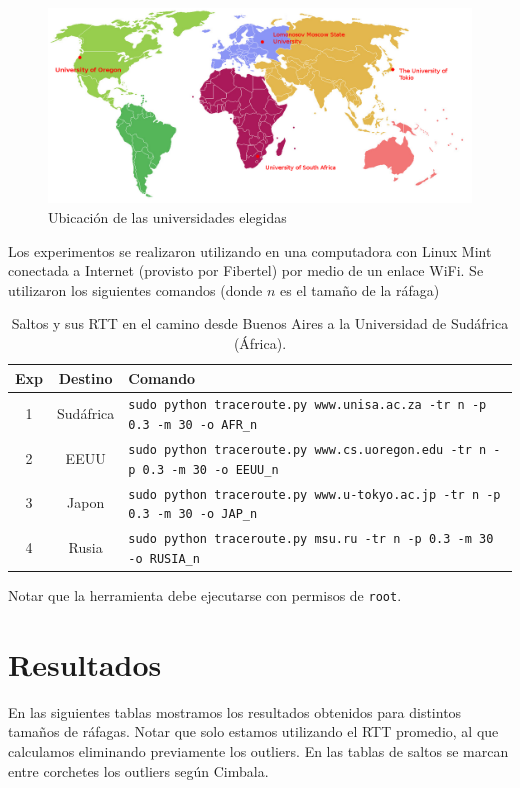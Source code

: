  
\begin{figure}[H]
  \centering
  \includegraphics[scale = 0.3]{imagenes/mapa.png}
  \caption{Ubicación de las universidades elegidas}
  \label{histogramaprobabilidadesModel1}
\end{figure}


Los experimentos se realizaron utilizando en una computadora con Linux Mint conectada a Internet (provisto por Fibertel) por medio de un enlace WiFi. Se utilizaron los siguientes comandos (donde $n$ es el tamaño de la ráfaga) 
\begin{table}[]
\centering
\caption{Saltos y sus RTT en el camino desde Buenos Aires a la Universidad de Sudáfrica (África).}
\begin{tabular}{ | c | c | l |}
	\hline 
Exp & Destino & Comando\\ \hline
 1 & Sudáfrica & \texttt{sudo python traceroute.py www.unisa.ac.za -tr n -p 0.3 -m 30 -o AFR\_n} \\ 
  2 & EEUU& \texttt{sudo python traceroute.py www.cs.uoregon.edu -tr n -p 0.3 -m 30 -o EEUU\_n} \\ 
  3 & Japon& \texttt{sudo python traceroute.py www.u-tokyo.ac.jp -tr n -p 0.3 -m 30 -o JAP\_n} \\ 
  4 & Rusia & \texttt{sudo python traceroute.py msu.ru -tr n -p 0.3 -m 30 -o RUSIA\_n} \\ 
  \hline

\end{tabular}
\end{table}
  Notar que la herramienta debe ejecutarse con permisos de \texttt{root}.
  
\section{Resultados}

En las siguientes tablas mostramos los resultados obtenidos para distintos tamaños de ráfagas. 
Notar que solo estamos utilizando el RTT promedio, al que calculamos eliminando previamente los outliers. 
En las tablas de saltos se marcan entre corchetes los outliers según Cimbala.




